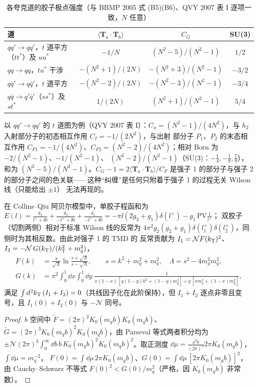 \begin{table}[htbp]\centering
\caption{各夸克道的胶子极点强度（与 BBMP 2005 式 (B5)(B6)、QVY 2007 表 I 逐项一致，$N$ 任意）}\label{tab:glb-CG}
\begin{tabular}{@{}lccc@{}}\toprule
道 & $\langle\bm T_a\!\cdot\!\bm T_b\rangle$ & $C_G$ & SU(3)\\\midrule
$qq'\to qq'$，$t$ 道平方（$tt^*$）及 $uu^*$ & $-1/N$ & $(N^2-5)/(N^2-1)$ & $1/2$\\
$qq\to qq$，$tu^*$ 干涉 & $-(N^2+1)/(2N)$ & $-(N^2+3)/(N^2-1)$ & $-3/2$\\
$q\bar q'\to q\bar q'$，$t$ 道平方 & $-(N^2-2)/(2N)$ & $-(N^2-3)/(N^2-1)$ & $-3/4$\\
$q\bar q\to q'\bar q'$（$ss^*$）及 $st^*$ & $1/(2N)$ & $(N^2+1)/(N^2-1)$ & $5/4$\\\bottomrule
\end{tabular}
\end{table}

以 $qq'\to qq'$ 的 $t$ 道图为例（QVY 2007 表 I）：$C_u=(N^2-1)/(4N^2)$，与 $h_2$ 入射部分子的初态相互作用 $C_I=-1/(2N^2)$，与出射
部分子 $P_1$、$P_2$ 的末态相互作用 $C_{F1}=-1/(4N^2)$、$C_{F2}=(N^2-2)/(4N^2)$；相对 Born 为 $-2/(N^2-1)$、$-1/(N^2-1)$、
$(N^2-2)/(N^2-1)$（SU(3)：$-\tfrac14,-\tfrac18,\tfrac78$），和为 $(N^2-5)/(N^2-1)$。$C_G-1=2\langle\bm T_a\!\cdot\!\bm T_b\rangle/C_F$
是强子 1 的部分子与强子 2 的部分子之间的色关联——这种“纠缠”是任何只附着于强子 1 的过程无关 Wilson 线（只能给出 $\pm1$）
无法再现的。

\begin{proposition}\label{prop:glb-C07}
在 Collins--Qiu 阿贝尔模型中，单胶子程函和为
$E(l)=\frac{g_2}{l^++\ii0}+\frac{g_2}{-l^++\ii0}+\frac{g_1}{-l^++\ii0}=-\pi\ii(2g_2+g_1)\delta(l^+)-g_1\,\mathrm{PV}\frac1{l^+}$；
双胶子（切割两侧）相对于标准 Wilson 线的反常为 $4\pi^2g_2(g_2+g_1)\delta(l_1^+)\delta(l_2^+)$，同侧时为其相反数。由此对强子 1 的 TMD 的
反常贡献为 $I_1=\mathcal N F(k_{\mathrm{T}})^2$、$I_2=-\mathcal N\,G(k_{\mathrm{T}})/(k_{\mathrm{T}}^2+m_q^2)$，
\begin{equation}\label{eq:glb-FG}
\begin{aligned}
F(k)&=\frac{\pi}{\sqrt\Lambda}\ln\frac{s+\sqrt\Lambda}{s-\sqrt\Lambda},\qquad s=k^2+m_g^2+m_q^2,\quad \Lambda=s^2-4m_g^2m_q^2,\\
G(k)&=\pi^2\!\int_0^1\!\!\dd x\!\int_0^1\!\!\dd y\;\frac{1}{x(1-x)\,[y(1-y)k^2+(1-y)m_g^2]+y\,[xm_q^2+(1-x)m_g^2]},
\end{aligned}
\end{equation}
满足 $\int\mathrm{d}^2k_{\mathrm{T}}\,(I_1+I_2)=0$（共线因子化在此阶保持），但 $I_1+I_2$ 逐点非零且变号，且 $I_1(0)+I_2(0)$ 与 $-\mathcal N$ 同号。
\end{proposition}
\begin{proof}
$b$ 空间中 $\tilde F=(2\pi)^2K_0(m_gb)K_0(m_qb)$、$\tilde G=(2\pi)^3K_0(m_gb)^2K_0(m_qb)$，由 Parseval 等式两者积分均为
$\pm\mathcal N(2\pi)^3\int_0^\infty\dd b\,b\,K_0(m_gb)^2K_0(m_qb)^2$。取正测度 $\dd\mu=\frac{\dd^2b}{(2\pi)^2}2\pi K_0(m_qb)$，$\int\dd\mu=m_q^{-2}$，
$F(0)=\int\dd\mu\,2\pi K_0(m_gb)$、$G(0)=\int\dd\mu\,[2\pi K_0(m_gb)]^2$，由 Cauchy--Schwarz 不等式 $F(0)^2<G(0)/m_q^2$（严格，因 $K_0(m_gb)$ 非常数）。
\end{proof}

